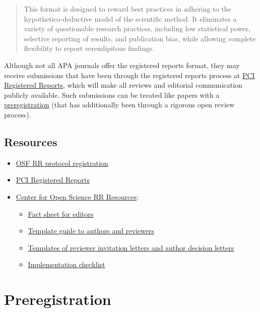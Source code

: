 \documentclass[
  oneside]{book}
\providecommand{\tightlist}{%
  \setlength{\itemsep}{0pt}\setlength{\parskip}{0pt}}
\begin{document}
\begin{quote}
This format is designed to reward best practices in adhering to the hypothetico-deductive model of the scientific method. It eliminates a variety of questionable research practices, including low statistical power, selective reporting of results, and publication bias, while allowing complete flexibility to report serendipitous findings.
\end{quote}

Although not all APA journals offer the registered reports format, they may receive submissions that have been through the registered reports process at \href{https://rr.peercommunityin.org/}{PCI Registered Reports}, which will make all reviews and editorial communication publicly available. Such submissions can be treated like papers with a \protect\hyperlink{preregistration}{preregistration} (that has additionally been through a rigorous open review process).

\hypertarget{resources-1}{%
\section{Resources}\label{resources-1}}

\begin{itemize}
\tightlist
\item
  \href{https://osf.io/rr/}{OSF RR protocol registration}
\item
  \href{https://rr.peercommunityin.org/}{PCI Registered Reports}
\item
  \href{https://www.cos.io/initiatives/registered-reports}{Center for Open Science RR Resources}:

  \begin{itemize}
  \tightlist
  \item
    \href{https://osf.io/jbeus/}{Fact sheet for editors}
  \item
    \href{https://osf.io/pukzy/}{Template guide to authors and reviewers}
  \item
    \href{https://osf.io/5adi7/}{Templates of reviewer invitation letters and author decision letters}
  \item
    \href{https://osf.io/2m4ct/}{Implementation checklist}
  \end{itemize}
\end{itemize}

\hypertarget{editors-prereg}{%
\chapter{Preregistration}\label{editors-prereg}}
\end{document}
